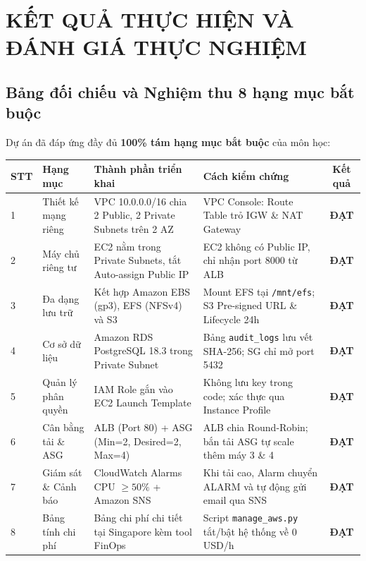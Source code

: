 \documentclass[12pt,a4paper]{report}
\begin{document}
\chapter{KẾT QUẢ THỰC HIỆN VÀ ĐÁNH GIÁ THỰC NGHIỆM}

\section{Bảng đối chiếu và Nghiệm thu 8 hạng mục bắt buộc}
Dự án đã đáp ứng đầy đủ \textbf{100\% tám hạng mục bắt buộc} của môn học:
\begin{table}[h!]
\centering
\small
\begin{tabular}{p{0.5cm}p{3.2cm}p{5.5cm}p{4cm}c}
\toprule
\textbf{STT} & \textbf{Hạng mục} & \textbf{Thành phần triển khai} & \textbf{Cách kiểm chứng} & \textbf{Kết quả} \\
\midrule
1 & Thiết kế mạng riêng & VPC 10.0.0.0/16 chia 2 Public, 2 Private Subnets trên 2 AZ & VPC Console: Route Table trỏ IGW \& NAT Gateway & \textbf{ĐẠT} \\
2 & Máy chủ riêng tư & EC2 nằm trong Private Subnets, tắt Auto-assign Public IP & EC2 không có Public IP, chỉ nhận port 8000 từ ALB & \textbf{ĐẠT} \\
3 & Đa dạng lưu trữ & Kết hợp Amazon EBS (gp3), EFS (NFSv4) và S3 & Mount EFS tại \texttt{/mnt/efs}; S3 Pre-signed URL \& Lifecycle 24h & \textbf{ĐẠT} \\
4 & Cơ sở dữ liệu & Amazon RDS PostgreSQL 18.3 trong Private Subnet & Bảng \texttt{audit\_logs} lưu vết SHA-256; SG chỉ mở port 5432 & \textbf{ĐẠT} \\
5 & Quản lý phân quyền & IAM Role gắn vào EC2 Launch Template & Không lưu key trong code; xác thực qua Instance Profile & \textbf{ĐẠT} \\
6 & Cân bằng tải \& ASG & ALB (Port 80) + ASG (Min=2, Desired=2, Max=4) & ALB chia Round-Robin; bắn tải ASG tự scale thêm máy 3 \& 4 & \textbf{ĐẠT} \\
7 & Giám sát \& Cảnh báo & CloudWatch Alarms CPU $\ge 50\%$ + Amazon SNS & Khi tải cao, Alarm chuyển ALARM và tự động gửi email qua SNS & \textbf{ĐẠT} \\
8 & Bảng tính chi phí & Bảng chi phí chi tiết tại Singapore kèm tool FinOps & Script \texttt{manage\_aws.py} tắt/bật hệ thống về 0 USD/h & \textbf{ĐẠT} \\
\bottomrule
\end{tabular}
\end{table}
\end{document}
